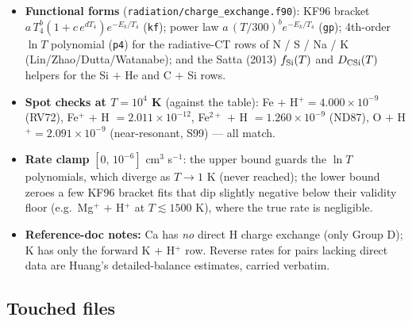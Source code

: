 \documentclass[english,a4paper]{kiseon_memo}
\begin{document}
{\sloppy
\begin{itemize}
\item \textbf{Functional forms} (\texttt{radiation/charge\_exchange.f90}): KF96
  bracket $a\,T_4^b(1+c\,e^{d T_4})e^{-E_k/T_4}$ (\verb|kf|); power law
  $a\,(T/300)^b e^{-E_k/T_4}$ (\verb|gp|); 4th-order $\ln T$ polynomial
  (\verb|p4|) for the radiative-CT rows of N / S / Na / K
  (Lin/Zhao/Dutta/Watanabe); and the Satta (2013) $f_{\rm Si}(T)$ and
  $D_{\rm CSi}(T)$ helpers for the Si $+$ He and C $+$ Si rows.
\item \textbf{Spot checks at $T=10^4$ K} (against the table):
  Fe $+$ H$^+ = 4.000\times10^{-9}$ (RV72), Fe$^+$ $+$ H $= 2.011\times10^{-12}$,
  Fe$^{2+}$ $+$ H $= 1.260\times10^{-9}$ (ND87), O $+$ H$^+ = 2.091\times10^{-9}$
  (near-resonant, S99) --- all match.
\item \textbf{Rate clamp} $[0,\,10^{-6}]$ cm$^3$ s$^{-1}$: the upper bound guards
  the $\ln T$ polynomials, which diverge as $T\to1$ K (never reached); the lower
  bound zeroes a few KF96 bracket fits that dip slightly negative below their
  validity floor (e.g.\ Mg$^+$ $+$ H$^+$ at $T\lesssim1500$ K), where the true
  rate is negligible.
\item \textbf{Reference-doc notes:} Ca has \emph{no} direct H charge exchange
  (only Group D); K has only the forward K $+$ H$^+$ row. Reverse rates for pairs
  lacking direct data are Huang's detailed-balance estimates, carried verbatim.
\end{itemize}
}

\subsection{Touched files}
\end{document}
